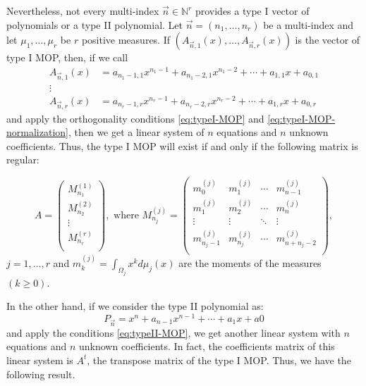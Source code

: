 \documentclass[12pt,a4]{article}
\theoremstyle{plain}
\newcommand{\N}[0]{\mathbb{N}}
\begin{document}
Nevertheless, not every multi-index $\vec n\in\N^r$ provides a type I vector of polynomials or a type II polynomial. Let $\vec n = (n_1,\dots,n_r)$ be a multi-index and let $\mu_1,\dots,\mu_r$ be $r$ positive measures. If $(A_{\vec n, 1}(x), \dots, A_{\vec n, r}(x))$ is the vector of type I MOP, then, if we call
\begin{equation}
    \begin{split}
        A_{\vec n,1}(x) &= a_{n_1-1,1}x^{n_1-1} + a_{n_1-2,1}x^{n_1-2} + \cdots + a_{1,1}x + a_{0,1} \\
        \vdots & \\
        A_{\vec n,r}(x) &= a_{n_r-1,r}x^{n_r-1} + a_{n_r-2,r}x^{n_r-2} + \cdots + a_{1,r}x + a_{0,r}
    \end{split}
\end{equation}
and apply the orthogonality conditions \eqref{eq:typeI-MOP} and \eqref{eq:typeI-MOP-normalization}, then we get a linear system of $n$ equations and $n$ unknown coefficients. Thus, the type I MOP will exist if and only if the following matrix is regular:

\begin{equation}
    \label{eq:MOP-matrix}
    A=\left(\begin{array}{c}
    M_{n_1}^{(1)} \\ \hline
    M_{n_2}^{(2)} \\ \hline
    \vdots \\ \hline
    M_{n_r}^{(r)} \\ 
\end{array}\right), \text{ \ \  where \ \ } M_{n_j}^{(j)} = \begin{pmatrix}
    m_0^{(j)} & m_1^{(j)} & \cdots & m_{n-1}^{(j)} \\
    m_1^{(j)} & m_2^{(j)} & \cdots & m_{n}^{(j)} \\
    \vdots & \vdots & \ddots & \vdots \\
    m_{n_j-1}^{(j)} & m_{n_j}^{(j)} & \cdots & m_{n+n_j-2}^{(j)} \\
\end{pmatrix},
\end{equation}
$j=1,\dots,r$ and $m_k^{(j)}=\displaystyle\int_{\Omega_j} x^k d\mu_j(x)$ are the moments of the measures $(k\geq 0)$.

In the other hand, if we consider the type II polynomial as:
$$
P_{\vec n} = x^n + a_{n-1} x^{n-1} + \cdots + a_1 x + a0
$$
and apply the conditions \eqref{eq:typeII-MOP}, we get another linear system with $n$ equations and $n$ unknown coefficients. In fact, the coefficients matrix of this linear system is $A^t$, the transpose matrix of the type I MOP. Thus, we have the following result.
\end{document}
